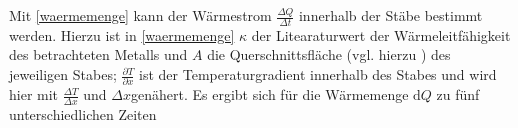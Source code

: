 Mit \eqref{waermemenge} kann der Wärmestrom $\frac{\Delta{Q}}{\Delta{t}}$ innerhalb der Stäbe bestimmt werden. 
Hierzu ist in \eqref{waermemenge} $\kappa$ der Litearaturwert der Wärmeleitfähigkeit des betrachteten Metalls und $A$ die Querschnittsfläche (vgl. hierzu \cite{V204}) des jeweiligen Stabes; $\frac{\partial T}{\partial x}$ ist der Temperaturgradient innerhalb des Stabes und wird hier mit $\frac{\Delta T}{\Delta x}$ und $\Delta x$genähert.
Es ergibt sich für die Wärmemenge $\mathup{d}Q$ zu fünf unterschiedlichen Zeiten
%
